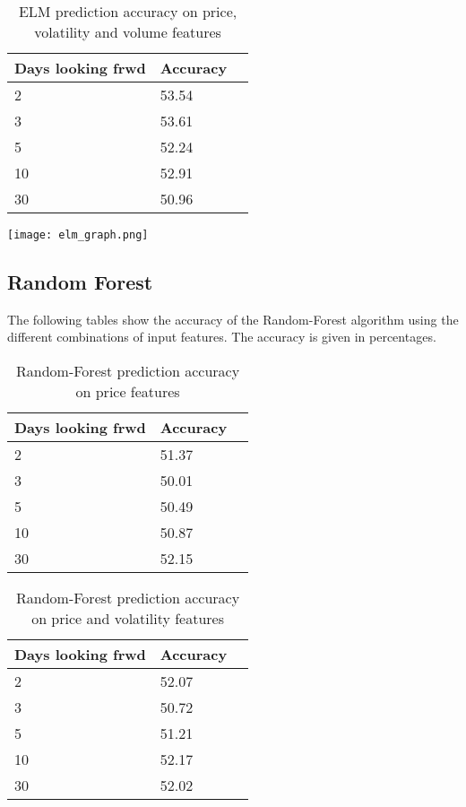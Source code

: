 \documentclass{article}
\begin{document}
\begin{table}[!h]
\begin{center}
    \begin{tabular}{ | l | l | p{3cm} |}
    \hline
    Days looking frwd & Accuracy \\ \hline
    2 & 53.54  \\ \hline
    3 & 53.61  \\ \hline
    5 & 52.24  \\ \hline
    10 & 52.91  \\ \hline
    30 & 50.96 \\ 
    \hline
    \end{tabular}
\caption{ELM prediction accuracy on price, volatility and volume features}
\end{center}
\end{table}
\texttt{[image: elm\_graph.png]}

\newpage
\subsection{Random Forest}
The following tables show the accuracy of the Random-Forest algorithm using the different combinations of input features. The accuracy is given in percentages.
\begin{table}[!h]
\begin{center}
    \begin{tabular}{ | l | l | p{3cm} |}
    \hline
    Days looking frwd & Accuracy \\ \hline
    2 & 51.37  \\ \hline
    3 & 50.01  \\ \hline
    5 & 50.49  \\ \hline
    10 & 50.87  \\ \hline
    30 & 52.15 \\ 
    \hline
    \end{tabular}
\caption{Random-Forest prediction accuracy on price features}
\end{center}
\end{table}

\begin{table}[h]
\begin{center}
    \begin{tabular}{ | l | l | p{3cm} |}
    \hline
    Days looking frwd & Accuracy \\ \hline
    2 & 52.07  \\ \hline
    3 & 50.72  \\ \hline
    5 & 51.21  \\ \hline
    10 & 52.17  \\ \hline
    30 & 52.02 \\ 
    \hline
    \end{tabular}
\caption{Random-Forest prediction accuracy on price and volatility features}
\end{center}
\end{table}
\end{document}

